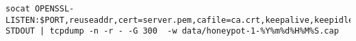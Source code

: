 
\begin{lstlisting}
socat OPENSSL-LISTEN:$PORT,reuseaddr,cert=server.pem,cafile=ca.crt,keepalive,keepidle=30,keepcnt=3 STDOUT | tcpdump -n -r - -G 300  -w data/honeypot-1-%Y%m%d%H%M%S.cap
\end{lstlisting}

